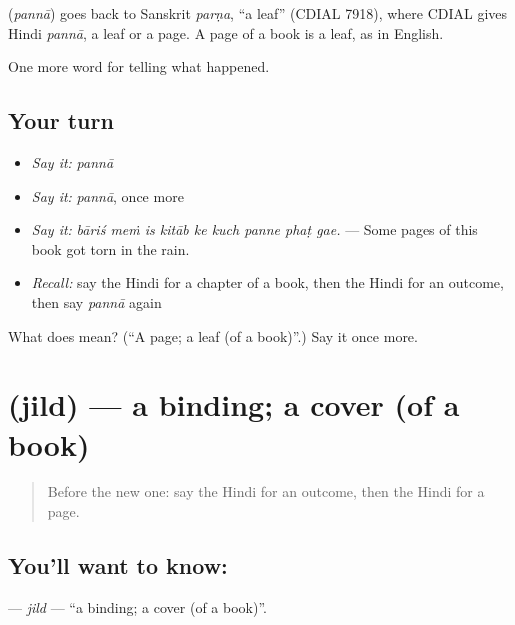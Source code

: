 \begin{cousinweb}
\textbf{} (\emph{pannā}) goes back to Sanskrit \emph{parṇa}, \textquotedblleft{}a leaf\textquotedblright{} (CDIAL 7918), where CDIAL gives Hindi \emph{pannā}, a leaf or a page. A page of a book is a leaf, as in English.
\end{cousinweb}

\begin{grammarlens}[title={What you've built}]
One more word for telling what happened.
\end{grammarlens}

\subsection*{Your turn}
\begin{itemize}
\raggedright
  \item \emph{Say it:} \emph{pannā}
  \item \emph{Say it:} \emph{pannā}, once more
  \item \emph{Say it:} \emph{bāriś meṁ is kitāb ke kuch panne phaṭ gae.} — Some pages of this book got torn in the rain.
  \item \emph{Recall:} say the Hindi for a chapter of a book, then the Hindi for an outcome, then say \emph{pannā} again
\end{itemize}

\begin{tcolorbox}[breakable,colback=teal!4,colframe=teal!35!black,title={Before you move on}]
What does  mean? (\textquotedblleft{}A page; a leaf (of a book)\textquotedblright{}.) Say it once more.
\end{tcolorbox}
\section[\texorpdfstring{\hi{जिल्द} (jild)}{जिल्द (jild)}]{ (jild) — a binding; a cover (of a book)}

\label{lesson:HI-C341-jild}



\begin{quote}
Before the new one: say the Hindi for an outcome, then the Hindi for a page.
\end{quote}

\subsection*{You'll want to know: }
\textbf{} — \emph{jild} — \textquotedblleft{}a binding; a cover (of a book)\textquotedblright{}.

